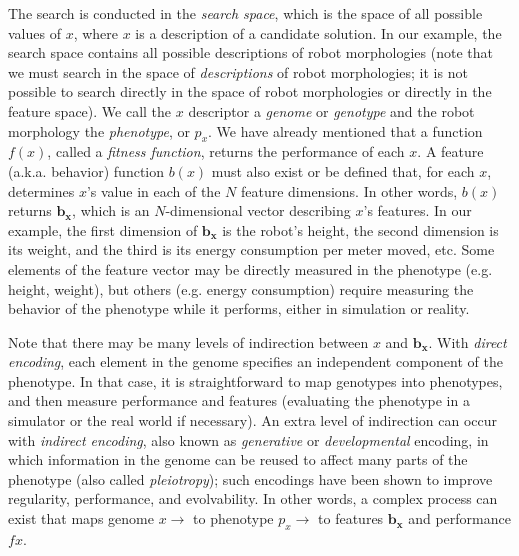 \documentclass[twocolumn, DIV25, 9pt]{scrartcl}
\begin{document}
The search is conducted in the \emph{search space}, which is the space of all possible values of $x$, where $x$ is a description of a candidate solution. In our example, the search space contains all possible descriptions of robot morphologies (note that we must search in the space of \emph{descriptions} of robot morphologies; it is not possible to search directly in the space of robot morphologies or directly in the feature space). We call the $x$ descriptor a \emph{genome} or \emph{genotype} and the robot morphology the \emph{phenotype}, or $p_{x}$. We have already mentioned that a function $f(x)$, called a \emph{fitness function}, returns the performance of each $x$. A feature (a.k.a. behavior) function $b(x)$ must also exist or be defined that, for each $x$, determines $x$'s value in each of the $N$ feature dimensions. In other words, $b(x)$ returns $\mathbf{b_{x}}$, which is an $N$-dimensional vector describing $x$'s features. In our example, the first dimension of $\mathbf{b_{x}}$ is the robot's height, the second dimension is its weight, and the third is its energy consumption per meter moved, etc. Some elements of the feature vector may be directly measured in the phenotype (e.g. height, weight), but others (e.g. energy consumption) require measuring the behavior of the phenotype while it performs, either in simulation or reality.
  
Note that there may be many levels of indirection between $x$ and $\mathbf{b_{x}}$. With \emph{direct encoding}, each element in the genome specifies an independent component of the phenotype\cite{stanley2003taxonomy, clune2011performance, floreano2008bio}. In that case, it is straightforward to map genotypes into phenotypes, and then measure performance and features (evaluating the phenotype in a simulator or the real world if necessary).  An extra level of indirection can occur with \emph{indirect encoding}, also known as \emph{generative} or \emph{developmental} encoding, in which information in the genome can be reused to affect many parts of the phenotype (also called \emph{pleiotropy}); such encodings have been shown to improve regularity, performance, and evolvability\cite{stanley2003taxonomy, clune2011performance, floreano2008bio,cheney2013unshackling, hornby2003generative, clune2009evolving, lee2013evolving, yosinski2011gaits, hornby2002creating, hornby2004functional}. In other words, a complex process can exist that maps genome $x \rightarrow$ to phenotype $p_{x}  \rightarrow$ to features  $\mathbf{b_{x}}$ and performance $f{x}$. 
\end{document}
